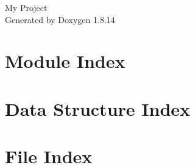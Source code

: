 \documentclass[twoside]{book}
\newcommand{\+}{\discretionary{\mbox{\scriptsize$\hookleftarrow$}}{}{}}
\newcommand{\clearemptydoublepage}{%
  \newpage{\pagestyle{empty}\cleardoublepage}%
}
\begin{document}
\hypersetup{pageanchor=false,
             bookmarksnumbered=true,
             pdfencoding=unicode
            }
\begin{titlepage}
\vspace*{7cm}
\begin{center}%
{\Large My Project }\\
\vspace*{1cm}
{\large Generated by Doxygen 1.8.14}\\
\end{center}
\end{titlepage}
\clearemptydoublepage
{}
\tableofcontents
\clearemptydoublepage
{}
\hypersetup{pageanchor=true}

\chapter{Module Index}

\chapter{Data Structure Index}

\chapter{File Index}

\end{document}
